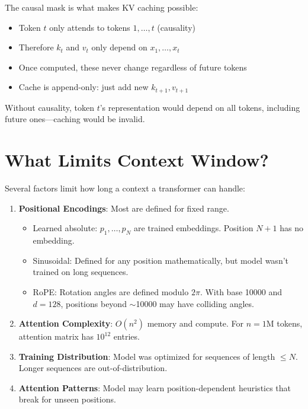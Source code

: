 \begin{remark}
    The causal mask is what makes KV caching possible:
    \begin{itemize}
        \item Token $t$ only attends to tokens $1, \ldots, t$ (causality)
        \item Therefore $k_t$ and $v_t$ only depend on $x_1, \ldots, x_t$
        \item Once computed, these never change regardless of future tokens
        \item Cache is append-only: just add new $k_{t+1}, v_{t+1}$
    \end{itemize}

    Without causality, token $t$'s representation would depend on all tokens, including future ones---caching would be invalid.
\end{remark}

\section{What Limits Context Window?}

\begin{remark}
    Several factors limit how long a context a transformer can handle:

    \begin{enumerate}
        \item \textbf{Positional Encodings}: Most are defined for fixed range.
        \begin{itemize}
            \item Learned absolute: $p_1, \ldots, p_N$ are trained embeddings. Position $N+1$ has no embedding.
            \item Sinusoidal: Defined for any position mathematically, but model wasn't trained on long sequences.
            \item RoPE: Rotation angles are defined modulo $2\pi$. With base 10000 and $d=128$, positions beyond $\sim$10000 may have colliding angles.
        \end{itemize}

        \item \textbf{Attention Complexity}: $O(n^2)$ memory and compute. For $n = 1$M tokens, attention matrix has $10^{12}$ entries.

        \item \textbf{Training Distribution}: Model was optimized for sequences of length $\leq N$. Longer sequences are out-of-distribution.

        \item \textbf{Attention Patterns}: Model may learn position-dependent heuristics that break for unseen positions.
    \end{enumerate}
\end{remark}


